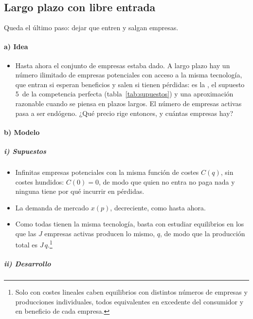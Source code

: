 \documentclass[11pt]{article}
\begin{document}
\subsection{Largo plazo con libre entrada}\label{sec:largo-plazo-libre-entrada}

Queda el último paso: dejar que entren y salgan empresas.

\paragraph{a) Idea}

\begin{itemize}
\item Hasta ahora el conjunto de empresas estaba dado. A largo plazo hay un número ilimitado de empresas potenciales con acceso a la misma tecnología, que entran si esperan beneficios y salen si tienen pérdidas: es la , el supuesto 5~de la competencia perfecta (tabla~\ref{tab:supuestos}) y una aproximación razonable cuando se piensa en plazos largos. El número de empresas activas pasa a ser endógeno. ¿Qué precio rige entonces, y cuántas empresas hay?
\end{itemize}

\paragraph{b) Modelo}

\subparagraph{i) Supuestos}

\begin{itemize}
\item Infinitas empresas potenciales con la misma función de costes $C(q)$, sin costes hundidos: $C(0)=0$, de modo que quien no entra no paga nada y ninguna tiene por qué incurrir en pérdidas.
\item La demanda de mercado $x(p)$, decreciente, como hasta ahora.
\item Como todas tienen la misma tecnología, basta con estudiar equilibrios en los que las $J$ empresas activas producen lo mismo, $q$, de modo que la producción total es $J\,q$.\footnote{Solo con costes lineales caben equilibrios con distintos números de empresas y producciones individuales, todos equivalentes en excedente del consumidor y en beneficio de cada empresa.}
\end{itemize}

\subparagraph{ii) Desarrollo}
\end{document}
